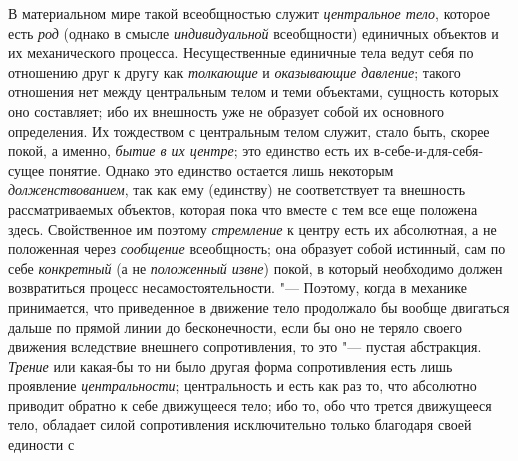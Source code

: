 В материальном мире такой всеобщностью служит
{\em центральное тело},
которое есть {\em род}
(однако в смысле
{\em индивидуальной}
всеобщности) единичных объектов и их механического процесса.
Несущественные единичные тела ведут себя по отношению друг к другу как
{\em толкающие} и
{\em оказывающие давление};
такого отношения нет между центральным телом и теми
объектами, сущность которых оно составляет; ибо их внешность уже не
образует собой их основного определения. Их тождеством с центральным телом
служит, стало быть, скорее покой, а именно,
{\em бытие в их центре};
это единство есть их в-себе-и-для-себя-сущее понятие. Однако
это единство остается лишь некоторым
{\em долженствованием},
так как ему (единству) не соответствует та внешность
рассматриваемых объектов, которая пока что вместе с тем все еще положена
здесь. Свойственное им поэтому
{\em стремление} к центру
есть их абсолютная, а не положенная через
{\em сообщение}
всеобщность; она образует собой истинный, сам по себе
{\em конкретный} (а не
{\em положенный извне})
покой, в который необходимо должен возвратиться процесс
несамостоятельности. "--- Поэтому, когда в механике
принимается, что приведенное в движение тело продолжало бы вообще двигаться
дальше по прямой линии до бесконечности, если бы оно не теряло своего
движения вследствие внешнего сопротивления, то это "--- пустая
абстракция. {\em Трение}
или какая-бы то ни было другая форма
сопротивления есть лишь проявление
{\em центральности};
центральность и есть как раз то, что абсолютно приводит
обратно к себе движущееся тело; ибо то, обо что трется движущееся тело,
обладает силой сопротивления исключительно только благодаря своей единости
с
